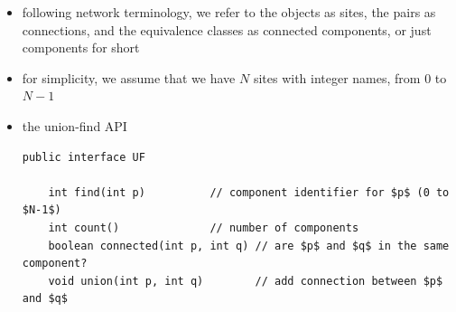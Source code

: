 \documentclass[8pt,a4paper,compress]{beamer}
\begin{document}
\begin{frame}[fragile]
\begin{itemize}
\item following network terminology, we refer to the objects as sites, the pairs as connections, and the equivalence classes as connected components, or just components for short

\item for simplicity, we assume that we have $N$ sites with integer names, from 0 to $N-1$

\item the union-find API
\begin{lstlisting}[language={},mathescape]
public interface UF

    int find(int p)          // component identifier for $p$ (0 to $N-1$)
    int count()              // number of components
    boolean connected(int p, int q) // are $p$ and $q$ in the same component?
    void union(int p, int q)        // add connection between $p$ and $q$
\end{lstlisting} 
\end{itemize}
\end{frame}
\end{document}
